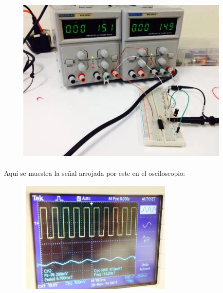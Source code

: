 \documentclass[12pt]{article}
\begin{document}
\begin{figure}[H]
	\begin{Center}
		\includegraphics[width=4.19in,height=3.32in]{./media/image10.png}
	\end{Center}
\end{figure}



\par
\newpage
\setlength{\parskip}{15.0pt}
\begin{Center}
\textcolor[HTML]{656565}{Aquí se muestra la señal arrojada por este en el osciloscopio:}
\end{Center}\par




\begin{figure}[H]
	\begin{Center}
		\includegraphics[width=3.03in,height=2.22in]{./media/image11.png}
	\end{Center}
\end{figure}
\end{document}
